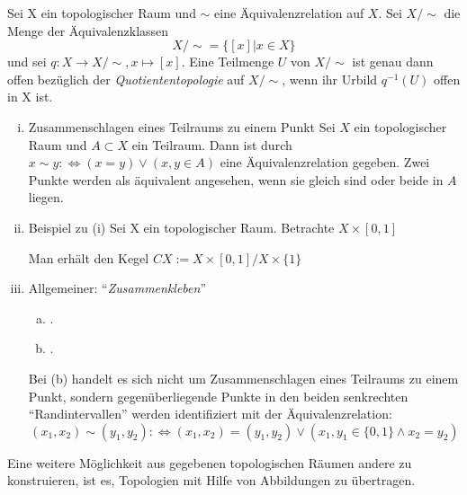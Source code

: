\documentclass[a4paper,10pt]{scrartcl}
\renewcommand{\equiv}{\Longleftrightarrow}
\begin{document}
\begin{df}
Sei X ein topologischer Raum und $\sim$ eine Äquivalenzrelation auf $ X $.  Sei $X/\sim$ die Menge der Äquivalenzklassen 
\[
X/\sim=\{[x]|x\in X\}
\]
und sei $ q: X\to X/\sim, x\mapsto [x] $. Eine Teilmenge $ U $ von $ X/\sim $ ist genau dann offen bezüglich der \emph{Quotiententopologie} auf $ X/\sim $, wenn ihr Urbild $ q^{-1}(U) $ offen in X ist.
\end{df}

\begin{ex*}
\begin{enumerate}[(i)]
\item \begin{seg}{Zusammenschlagen eines Teilraums zu einem Punkt}
Sei $ X $ ein topologischer Raum und $ A\subset X $ ein Teilraum. Dann ist durch $ x \sim y :\equiv (x=y)\lor (x,y\in A) $ eine Äquivalenzrelation gegeben.  Zwei Punkte werden als äquivalent angesehen, wenn sie gleich sind oder beide in $ A $ liegen.
\end{seg}
\item \begin{seg}{Beispiel zu (i)}
Sei X ein topologischer Raum. Betrachte $ X\times [0,1] $
\begin{figure}[H]
\centering
 
\caption{}
\end{figure}
Man erhält den Kegel $CX:=X\times[0,1]/X\times\{1\}$
\end{seg}
\item Allgemeiner: "`\emph{Zusammenkleben}"'
\begin{enumerate}[(a)]
\item .
\begin{figure}[H]
\centering
 
\caption{}
\end{figure}
\item .
\begin{figure}[H]
\centering
 
\caption{}
\end{figure}
\end{enumerate}
Bei (b) handelt es sich nicht um Zusammenschlagen eines Teilraums zu einem Punkt, sondern gegenüberliegende Punkte in den beiden senkrechten "`Randintervallen"' werden identifiziert mit der Äquivalenzrelation: \fixme[nachschauen]
\[
(x_1,x_2)\sim (y_1,y_2):\equiv (x_1,x_2)=(y_1,y_2)\lor (x_1,y_1 \in \{0,1\} \land x_2 =y_2)
\]
\end{enumerate}
\end{ex*}
Eine weitere Möglichkeit aus gegebenen topologischen Räumen andere zu konstruieren, ist es, Topologien mit Hilfe von Abbildungen zu übertragen.
\end{document}
